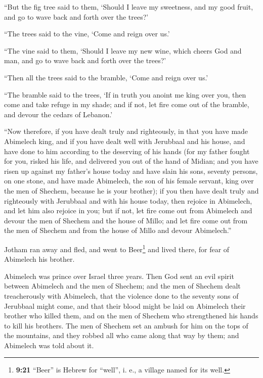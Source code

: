  ``But the fig tree said to them, `Should I leave my
sweetness, and my good fruit, and go to wave back and forth over the
trees?'

 ``The trees said to the vine, `Come and reign over us.'

 ``The vine said to them, `Should I leave my new wine,
which cheers God and man, and go to wave back and forth over the trees?'

 ``Then all the trees said to the bramble, `Come and
reign over us.'

 ``The bramble said to the trees, `If in truth you anoint
me king over you, then come and take refuge in my shade; and if not, let
fire come out of the bramble, and devour the cedars of Lebanon.'

 ``Now therefore, if you have dealt truly and
righteously, in that you have made Abimelech king, and if you have dealt
well with Jerubbaal and his house, and have done to him according to the
deserving of his hands  (for my father fought for you,
risked his life, and delivered you out of the hand of Midian;
 and you have risen up against my father's house today
and have slain his sons, seventy persons, on one stone, and have made
Abimelech, the son of his female servant, king over the men of Shechem,
because he is your brother);  if you then have dealt
truly and righteously with Jerubbaal and with his house today, then
rejoice in Abimelech, and let him also rejoice in you; 
but if not, let fire come out from Abimelech and devour the men of
Shechem and the house of Millo; and let fire come out from the men of
Shechem and from the house of Millo and devour Abimelech.''

 Jotham ran away and fled, and went to Beer\footnote{\textbf{9:21}
  ``Beer'' is Hebrew for ``well'', i. e., a village named for its well.}
and lived there, for fear of Abimelech his brother.

 Abimelech was prince over Israel three years.
 Then God sent an evil spirit between Abimelech and the
men of Shechem; and the men of Shechem dealt treacherously with
Abimelech,  that the violence done to the seventy sons of
Jerubbaal might come, and that their blood might be laid on Abimelech
their brother who killed them, and on the men of Shechem who
strengthened his hands to kill his brothers.  The men of
Shechem set an ambush for him on the tops of the mountains, and they
robbed all who came along that way by them; and Abimelech was told about
it.

